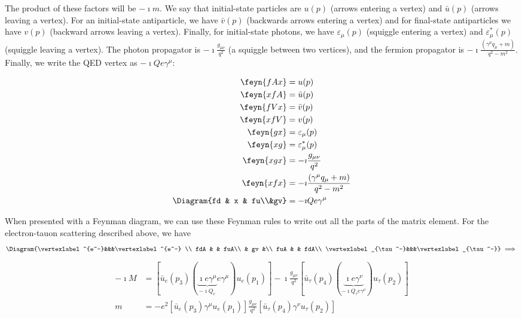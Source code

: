 \documentclass[a4paper,twoside,master.tex]{subfiles}
\begin{document}
The product of these factors will be $ - \imath m $. We say that initial-state particles are $ u(p) $ (arrows entering a vertex) and $ \bar{u}(p) $ (arrows leaving a vertex). For an initial-state antiparticle, we have $ \bar{v}(p) $ (backwards arrows entering a vertex) and for final-state antiparticles we have $ v(p) $ (backward arrows leaving a vertex). Finally, for initial-state photons, we have $ \varepsilon_{\mu}(p) $ (squiggle entering a vertex) and $ \varepsilon_{\mu}^*(p) $ (squiggle leaving a vertex). The photon propagator is $ - \imath \frac{g_{\mu \nu}}{q^2} $ (a squiggle between two vertices), and the fermion propagator is $ - \imath \frac{(\gamma^{\mu} q_{\mu} + m)}{q^2 - m^2} $. Finally, we write the QED vertex as $ - \imath Q e \gamma^{\mu} $:

\begin{align}
    \feyn{fA x} &= u(p) \\
    \feyn{x fA} &= \bar{u}(p) \\
    \feyn{fV x} &= \bar{v}(p) \\
    \feyn{x fV} &= v(p) \\
    \feyn{gx} &= \varepsilon_{\mu}(p) \\
    \feyn{xg} &= \varepsilon_{\mu}^*(p) \\
    \feyn{x g x} &= - \imath \frac{g_{\mu \nu}}{q^2} \\
    \feyn{x f x} &= - \imath \frac{(\gamma^{\mu} q_{\mu} + m)}{q^2 - m^2} \\
    \Diagram{fd & x & fu\\&gv} &= - \imath Q e \gamma^{\mu}
\end{align}

When presented with a Feynman diagram, we can use these Feynman rules to write out all the parts of the matrix element. For the electron-tauon scattering described above, we have
\begin{equation}
    \Diagram{\vertexlabel^{e^-}&&&\vertexlabel^{e^-} \\
fdA & & fuA\\
   & gv &\\
fuA & & fdA\\
   \vertexlabel_{\tau^-}&&&\vertexlabel_{\tau^-}}\implies
\end{equation}
\begin{align}
    - \imath M &= [\bar{u}_e(p_3) (\underbrace{\imath e \gamma^{\mu}}_{- \imath Q_e}e \gamma^{\mu}) u_e(p_1)] - \imath \frac{g_{\mu \nu}}{q^2} [\bar{u}_{\tau}(p_4) (\underbrace{\imath e \gamma^{\nu}}_{- \imath Q_{\tau} e \gamma^{\nu}})u_{\tau}(p_2)]\\
    m &= - e^2 [\bar{u}_e(p_3) \gamma^{\mu} u_e(p_1)] \frac{g_{\mu \nu}}{q^2} [\bar{u}_{\tau}(p_4) \gamma^{\nu} u_{\tau}(p_2)]
\end{align}
\end{document}
